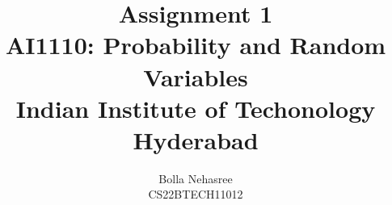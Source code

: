 \documentclass[journal,12pt]{IEEEtran}
\begin{document}
\let\vec\mathbf




\vspace{3cm}

\title{
\textbf {Assignment 1}\\ \large \textbf{AI1110}: Probability and Random Variables\\Indian Institute of Techonology Hyderabad
}
\author{Bolla Nehasree\\CS22BTECH11012}
	


%
%
%

% 
%
\end{document}
